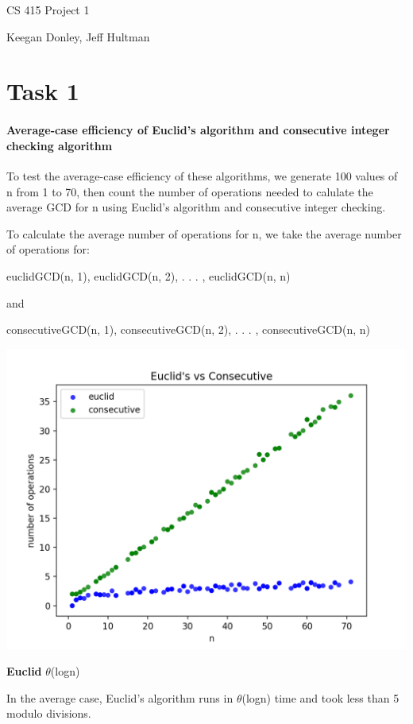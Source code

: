 \documentclass{report}
\begin{document}
	\begin{flushleft}
		\huge CS 415 Project 1
		
		\normalsize Keegan Donley, Jeff Hultman

		\section{Task 1}

		\paragraph{Average-case efficiency of Euclid's algorithm and consecutive integer checking algorithm}
		To test the average-case efficiency of these algorithms, we generate
		100 values of n from 1 to 70, then count the number of
		operations needed to calulate the average GCD for n using
		Euclid's algorithm and consecutive integer checking.

		To calculate the average number of operations for n, we take the average
		number of operations for:
		
		euclidGCD(n, 1), euclidGCD(n, 2), . . . , euclidGCD(n, n)

		and

		consecutiveGCD(n, 1), consecutiveGCD(n, 2), . . . , consecutiveGCD(n, n)

		\includegraphics{task1.png}

		\textbf{Euclid} $\theta$(logn)

		In the average case, Euclid's algorithm runs in $\theta$(logn) time and took less than 
		5 modulo divisions.
		

\end{flushleft}
\end{document}
